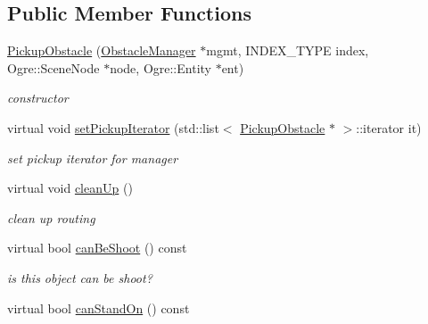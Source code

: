 \subsection*{Public Member Functions}
\begin{DoxyCompactItemize}
\item 
\hyperlink{class_n_c_t_u_1_1_pickup_obstacle_a59a11ebd318b216a4b3562b6a78cd5cf}{Pickup\+Obstacle} (\hyperlink{class_n_c_t_u_1_1_obstacle_manager}{Obstacle\+Manager} $\ast$mgmt, I\+N\+D\+E\+X\+\_\+\+T\+Y\+PE index, Ogre\+::\+Scene\+Node $\ast$node, Ogre\+::\+Entity $\ast$ent)\hypertarget{class_n_c_t_u_1_1_pickup_obstacle_a59a11ebd318b216a4b3562b6a78cd5cf}{}\label{class_n_c_t_u_1_1_pickup_obstacle_a59a11ebd318b216a4b3562b6a78cd5cf}

\begin{DoxyCompactList}\small\item\em constructor \end{DoxyCompactList}\item 
virtual void \hyperlink{class_n_c_t_u_1_1_pickup_obstacle_a4748f76158d2cac05d0aeecac10e6910}{set\+Pickup\+Iterator} (std\+::list$<$ \hyperlink{class_n_c_t_u_1_1_pickup_obstacle}{Pickup\+Obstacle} $\ast$ $>$\+::iterator it)\hypertarget{class_n_c_t_u_1_1_pickup_obstacle_a4748f76158d2cac05d0aeecac10e6910}{}\label{class_n_c_t_u_1_1_pickup_obstacle_a4748f76158d2cac05d0aeecac10e6910}

\begin{DoxyCompactList}\small\item\em set pickup iterator for manager \end{DoxyCompactList}\item 
virtual void \hyperlink{class_n_c_t_u_1_1_pickup_obstacle_a27afa507fc666bc80387be4cb75bc49a}{clean\+Up} ()\hypertarget{class_n_c_t_u_1_1_pickup_obstacle_a27afa507fc666bc80387be4cb75bc49a}{}\label{class_n_c_t_u_1_1_pickup_obstacle_a27afa507fc666bc80387be4cb75bc49a}

\begin{DoxyCompactList}\small\item\em clean up routing \end{DoxyCompactList}\item 
virtual bool \hyperlink{class_n_c_t_u_1_1_pickup_obstacle_aab9989c60aa142b509846608207622d9}{can\+Be\+Shoot} () const \hypertarget{class_n_c_t_u_1_1_pickup_obstacle_aab9989c60aa142b509846608207622d9}{}\label{class_n_c_t_u_1_1_pickup_obstacle_aab9989c60aa142b509846608207622d9}

\begin{DoxyCompactList}\small\item\em is this object can be shoot? \end{DoxyCompactList}\item 
virtual bool \hyperlink{class_n_c_t_u_1_1_pickup_obstacle_a4bfe9e56a0793947a464a42dc5286de3}{can\+Stand\+On} () const \hypertarget{class_n_c_t_u_1_1_pickup_obstacle_a4bfe9e56a0793947a464a42dc5286de3}{}\label{class_n_c_t_u_1_1_pickup_obstacle_a4bfe9e56a0793947a464a42dc5286de3}


\end{DoxyCompactItemize}
